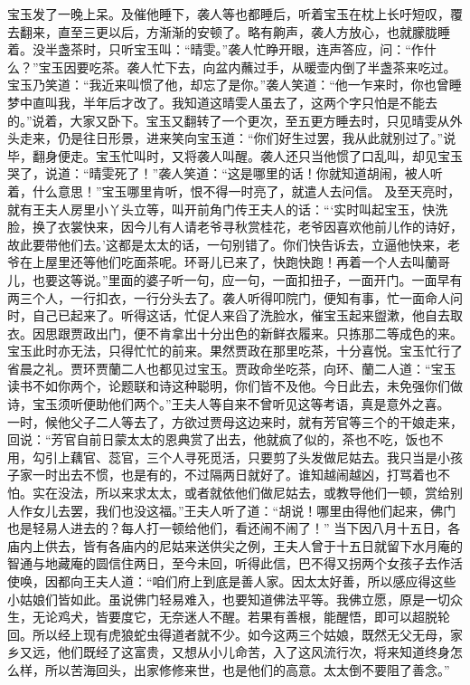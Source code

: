 \documentclass[12pt,oneside]{book}
\begin{document}
宝玉发了一晚上呆。及催他睡下，袭人等也都睡后，听着宝玉在枕上长吁短叹，覆去翻来，直至三更以后，方渐渐的安顿了。略有齁声，袭人方放心，也就朦胧睡着。没半盏茶时，只听宝玉叫：“晴雯。”袭人忙睁开眼，连声答应，问：“作什么？”宝玉因要吃茶。袭人忙下去，向盆内蘸过手，从暖壶内倒了半盏茶来吃过。宝玉乃笑道：“我近来叫惯了他，却忘了是你。”袭人笑道：“他一乍来时，你也曾睡梦中直叫我，半年后才改了。我知道这晴雯人虽去了，这两个字只怕是不能去的。”说着，大家又卧下。宝玉又翻转了一个更次，至五更方睡去时，只见晴雯从外头走来，仍是往日形景，进来笑向宝玉道：“你们好生过罢，我从此就别过了。”说毕，翻身便走。宝玉忙叫时，又将袭人叫醒。袭人还只当他惯了口乱叫，却见宝玉哭了，说道：“晴雯死了！”袭人笑道：“这是哪里的话！你就知道胡闹，被人听着，什么意思！”宝玉哪里肯听，恨不得一时亮了，就遣人去问信。
及至天亮时，就有王夫人房里小丫头立等，叫开前角门传王夫人的话：“‘实时叫起宝玉，快洗脸，换了衣裳快来，因今儿有人请老爷寻秋赏桂花，老爷因喜欢他前儿作的诗好，故此要带他们去。’这都是太太的话，一句别错了。你们快告诉去，立逼他快来，老爷在上屋里还等他们吃面茶呢。环哥儿已来了，快跑快跑！再着一个人去叫蘭哥儿，也要这等说。”里面的婆子听一句，应一句，一面扣扭子，一面开门。一面早有两三个人，一行扣衣，一行分头去了。袭人听得叩院门，便知有事，忙一面命人问时，自己已起来了。听得这话，忙促人来舀了洗脸水，催宝玉起来盥漱，他自去取衣。因思跟贾政出门，便不肯拿出十分出色的新鲜衣履来。只拣那二等成色的来。宝玉此时亦无法，只得忙忙的前来。果然贾政在那里吃茶，十分喜悦。宝玉忙行了省晨之礼。贾环贾蘭二人也都见过宝玉。贾政命坐吃茶，向环、蘭二人道：“宝玉读书不如你两个，论题联和诗这种聪明，你们皆不及他。今日此去，未免强你们做诗，宝玉须听便助他们两个。”王夫人等自来不曾听见这等考语，真是意外之喜。
一时，候他父子二人等去了，方欲过贾母这边来时，就有芳官等三个的干娘走来，回说：“芳官自前日蒙太太的恩典赏了出去，他就疯了似的，茶也不吃，饭也不用，勾引上藕官、蕊官，三个人寻死觅活，只要剪了头发做尼姑去。我只当是小孩子家一时出去不惯，也是有的，不过隔两日就好了。谁知越闹越凶，打骂着也不怕。实在没法，所以来求太太，或者就依他们做尼姑去，或教导他们一顿，赏给别人作女儿去罢，我们也没这福。”王夫人听了道：“胡说！哪里由得他们起来，佛门也是轻易人进去的？每人打一顿给他们，看还闹不闹了！”
当下因八月十五日，各庙内上供去，皆有各庙内的尼姑来送供尖之例，王夫人曾于十五日就留下水月庵的智通与地藏庵的圆信住两日，至今未回，听得此信，巴不得又拐两个女孩子去作活使唤，因都向王夫人道：“咱们府上到底是善人家。因太太好善，所以感应得这些小姑娘们皆如此。虽说佛门轻易难入，也要知道佛法平等。我佛立愿，原是一切众生，无论鸡犬，皆要度它，无奈迷人不醒。若果有善根，能醒悟，即可以超脱轮回。所以经上现有虎狼蛇虫得道者就不少。如今这两三个姑娘，既然无父无母，家乡又远，他们既经了这富贵，又想从小儿命苦，入了这风流行次，将来知道终身怎么样，所以苦海回头，出家修修来世，也是他们的高意。太太倒不要阻了善念。”
\end{document}
